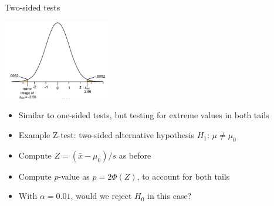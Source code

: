 \begin{frame}[c]{Two-sided tests}


\vspace*{-0.2cm}
\begin{center}
\includegraphics[height=3.5cm]{images/z_test_3.png}
\end{center}
\vspace*{-0.2cm}

\begin{itemize}
\item Similar to one-sided tests, but testing for extreme values in both tails
\item Example Z-test: two-sided alternative hypothesis $H_1$:
$\mu \neq \mu_0$
\pause
\smallskip
\item Compute $Z = (\bar{x}-\mu_0)/s$ as before
\item Compute $p$-value as $p = 2\Phi(Z)$, to account for both tails
\pause 
\medskip
\item With $\alpha = 0.01$, would we reject $H_0$ in this case? \hands
\end{itemize}

\end{frame}
